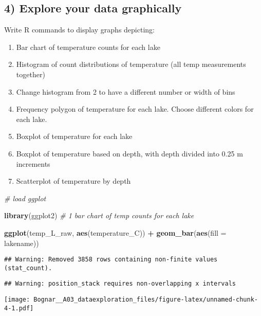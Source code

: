 \documentclass[]{article}
\newenvironment{Shaded}{\begin{snugshade}}{\end{snugshade}}
\newcommand{\KeywordTok}[1]{\textcolor[rgb]{0.13,0.29,0.53}{\textbf{#1}}}
\newcommand{\DataTypeTok}[1]{\textcolor[rgb]{0.13,0.29,0.53}{#1}}
\newcommand{\StringTok}[1]{\textcolor[rgb]{0.31,0.60,0.02}{#1}}
\newcommand{\CommentTok}[1]{\textcolor[rgb]{0.56,0.35,0.01}{\textit{#1}}}
\newcommand{\OperatorTok}[1]{\textcolor[rgb]{0.81,0.36,0.00}{\textbf{#1}}}
\newcommand{\NormalTok}[1]{#1}
\providecommand{\tightlist}{%
  \setlength{\itemsep}{0pt}\setlength{\parskip}{0pt}}
\begin{document}
\subsection{4) Explore your data
graphically}\label{explore-your-data-graphically}

Write R commands to display graphs depicting:

\begin{enumerate}
\def\labelenumi{\arabic{enumi}.}
\tightlist
\item
  Bar chart of temperature counts for each lake
\item
  Histogram of count distributions of temperature (all temp measurements
  together)
\item
  Change histogram from 2 to have a different number or width of bins
\item
  Frequency polygon of temperature for each lake. Choose different
  colors for each lake.
\item
  Boxplot of temperature for each lake
\item
  Boxplot of temperature based on depth, with depth divided into 0.25 m
  increments
\item
  Scatterplot of temperature by depth
\end{enumerate}

\begin{Shaded}
\begin{Highlighting}[]
\CommentTok{# load ggplot}

\KeywordTok{library}\NormalTok{(ggplot2)}
\CommentTok{# 1 bar chart of temp counts for each lake }

\KeywordTok{ggplot}\NormalTok{(temp_L_raw, }\KeywordTok{aes}\NormalTok{(temperature_C)) }\OperatorTok{+}
\StringTok{  }\KeywordTok{geom_bar}\NormalTok{(}\KeywordTok{aes}\NormalTok{(}\DataTypeTok{fill =}\NormalTok{ lakename))}
\end{Highlighting}
\end{Shaded}

\begin{verbatim}
## Warning: Removed 3858 rows containing non-finite values (stat_count).
\end{verbatim}

\begin{verbatim}
## Warning: position_stack requires non-overlapping x intervals
\end{verbatim}

\texttt{[image: Bognar\_\_A03\_dataexploration\_files/figure-latex/unnamed-chunk-4-1.pdf]}
\end{document}
